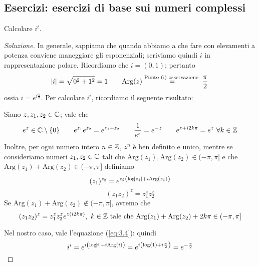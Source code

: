 \subsection{Esercizi: esercizi di base sui numeri complessi}
\begin{exercise}
    \label{ex:3.1}
    Calcolare $i^i$.
\end{exercise}
\begin{proof}[Soluzione]
    In generale, sappiamo che quando abbiamo a che fare con elevamenti a potenza conviene maneggiare gli esponenziali; scriviamo quindi $i$ in rappresentazione polare. Ricordiamo che $i=(0,1)$; pertanto
    \[
    \abs{i} = \sqrt{0^2 + 1^2} = 1 \qquad \text{Arg}(z) \overset{\text{Punto (i) osservazione }}{=} \frac{\pi}{2}
    \]
    ossia $i=e^{i\frac{\pi}{2}}$. Per calcolare $i^i$, ricordiamo il seguente risultato:
    \begin{tcolorbox}
        \begin{theorem}
            \label{th:3.3}
            Siano $z, z_1, z_2\in\amsbb{C}$; vale che 
            \[
            e^{z}\in\amsbb{C}\setminus\{0\} \qquad e^{z_1}e^{z_2} = e^{z_1+z_2} \qquad \frac{1}{e^{z}} = e^{-z} \qquad e^{z+i2k\pi} = e^{z} \ \forall k\in\amsbb{Z}
            \]
            Inoltre, per ogni numero intero $n\in\amsbb{Z}$, $z^n$ è ben definito e unico, mentre se consideriamo numeri $z_1, z_2\in\amsbb{C}$ tali che $\mathrm{Arg}(z_1), \mathrm{Arg}(z_2)\in(-\pi, \pi]$ e che $\mathrm{Arg}(z_1)+\mathrm{Arg}(z_2)\in(-\pi, \pi]$ definiamo
            \begin{equation}
                \label{eq:3.4}
                (z_1)^{z_2} = e^{z_2\left(\log\abs{z_1}+i\mathrm{Arg}(z_1)\right)}
            \end{equation}
            \begin{equation}
                \label{eq:3.5}
                (z_1 z_2)^z = z_1^z z_2^z
            \end{equation}
            Se $\mathrm{Arg}(z_1)+\mathrm{Arg}(z_2)\notin(-\pi, \pi]$, avremo che
            \begin{equation}
                \label{eq:3.6}
                (z_1 z_2)^z = z_1^z z_2^z e^{z(i2k\pi)}, \ k\in\amsbb{Z} \ \text{tale che} \ \mathrm{Arg}(z_1)+\mathrm{Arg}(z_2) + 2k\pi \in (-\pi, \pi]
            \end{equation}
        \end{theorem}
    \end{tcolorbox}
    Nel nostro caso, vale l'equazione (\ref{eq:3.4}): quindi
    \[
    i^i = e^{i\left(\log\abs{i} + i \mathrm{Arg}(i)\right)} = e^{i\left(\log(1) + i \frac{\pi}{2}\right)} = e^{-\frac{\pi}{2}}
    \]
\end{proof}
